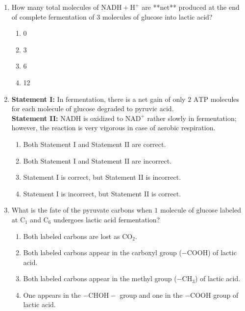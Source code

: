 \documentclass[11pt, a4paper]{article}
\begin{document}
\begin{enumerate}[label=\textbf{\arabic*.}]
\item How many total molecules of $\text{NADH} + \text{H}^+$ are **net** produced at the end of complete fermentation of $3\text{ molecules}$ of glucose into lactic acid?
\begin{enumerate}[label=(\Alph*)]
    \item 0
    \item 3
    \item 6
    \item 12
\end{enumerate}

\item \textbf{Statement I:} In fermentation, there is a net gain of only $2\text{ ATP}$ molecules for each molecule of glucose degraded to pyruvic acid. \\
\textbf{Statement II:} NADH is oxidized to $\text{NAD}^+$ rather slowly in fermentation; however, the reaction is very vigorous in case of aerobic respiration.
\begin{enumerate}[label=(\Alph*)]
    \item Both Statement I and Statement II are correct.
    \item Both Statement I and Statement II are incorrect.
    \item Statement I is correct, but Statement II is incorrect.
    \item Statement I is incorrect, but Statement II is correct.
\end{enumerate}

\item What is the fate of the pyruvate carbons when $1\text{ molecule}$ of glucose labeled at $\text{C}_1$ and $\text{C}_6$ undergoes lactic acid fermentation?
\begin{enumerate}[label=(\Alph*)]
    \item Both labeled carbons are lost as $\text{CO}_2$.
    \item Both labeled carbons appear in the carboxyl group ($-\text{COOH}$) of lactic acid.
    \item Both labeled carbons appear in the methyl group ($-\text{CH}_3$) of lactic acid.
    \item One appears in the $-\text{CHOH}-$ group and one in the $-\text{COOH}$ group of lactic acid.
\end{enumerate}


\end{enumerate}
\end{document}

